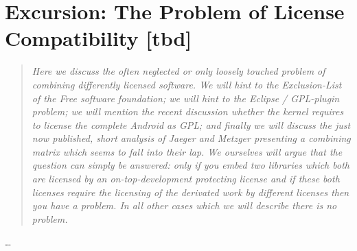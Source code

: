 %
%
%
%
%



\section{Excursion: The Problem of License Compatibility [tbd]}
\footnotesize
\begin{quote}\itshape
Here we discuss the often neglected or only loosely touched problem of combining
differently licensed software. We will hint to the Exclusion-List of the Free
software foundation; we will hint to the Eclipse / GPL-plugin problem; we will
mention the recent discussion whether the kernel requires to license the
complete Android as GPL; and finally we will discuss the just now published, short
analysis of Jaeger and Metzger presenting a combining matrix which seems to fall
into their lap. We ourselves will argue that the question can simply be answered:
only if you embed two libraries which both are licensed by an
on-top-development protecting license and if these both licenses require the
licensing of the derivated work by different licenses then you have a problem.
In all other cases which we will describe there is no problem.
\end{quote}
\normalsize
\ldots

%
